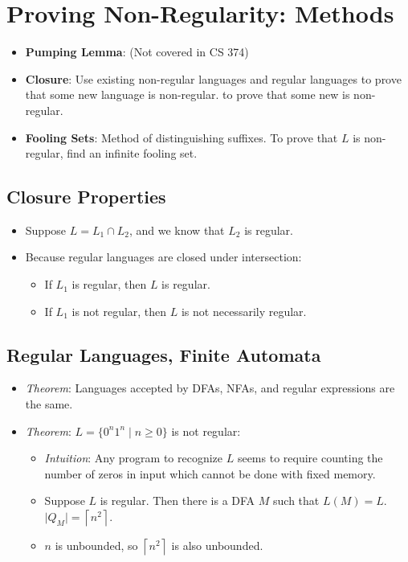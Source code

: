 \documentclass[12pt]{article}
\date{February 16, 2021}
\begin{document}
\maketitle

\section{Proving Non-Regularity: Methods}
\begin{itemize}
    \item \textbf{Pumping Lemma}: (Not covered in CS 374)
    \item \textbf{Closure}: Use existing non-regular languages and regular languages to prove that some new language is non-regular. to prove that some new  is non-regular.
    \item \textbf{Fooling Sets}: Method of distinguishing suffixes. To prove that $L$ is non-regular, find an infinite fooling set.
\end{itemize}

\subsection{Closure Properties}
\begin{itemize}
    \item Suppose $L = L_1 \cap L_2$, and we know that $L_2$ is regular.
    \item Because regular languages are closed under intersection:
    \begin{itemize}
        \item If $L_1$ is regular, then $L$ is regular.
        \item If $L_1$ is not regular, then $L$ is not necessarily regular.
    \end{itemize}
\end{itemize}

\subsection{Regular Languages, Finite Automata}
\begin{itemize}
    \item \textit{Theorem}: Languages accepted by DFAs, NFAs, and regular expressions are the same.
    \item \textit{Theorem}: $L = \{ 0^n 1^n \mid n \geq 0 \}$ is not regular:
    \begin{itemize}
        \item \textit{Intuition}: Any program to recognize $L$ seems to require counting the number of zeros in input which cannot be done with fixed memory.
        \item Suppose $L$ is regular. Then there is a DFA $M$ such that $L(M) = L$. $\lvert Q_M \rvert = \left \lceil{n^2}\right \rceil$.
        \item $n$ is unbounded, so $\left \lceil{n^2}\right \rceil$ is also unbounded.
    \end{itemize}
\end{itemize}
\end{document}
